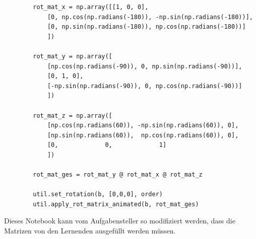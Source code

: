 \begin{center}
    \begin{verbatim}
        rot_mat_x = np.array([[1, 0, 0],
            [0, np.cos(np.radians(-180)), -np.sin(np.radians(-180))],
            [0, np.sin(np.radians(-180)), np.cos(np.radians(-180))]
            ])

        rot_mat_y = np.array([
            [np.cos(np.radians(-90)), 0, np.sin(np.radians(-90))],
            [0, 1, 0],
            [-np.sin(np.radians(-90)), 0, np.cos(np.radians(-90))]
            ])

        rot_mat_z = np.array([
            [np.cos(np.radians(60)), -np.sin(np.radians(60)), 0],
            [np.sin(np.radians(60)),  np.cos(np.radians(60)), 0],
            [0,             0,             1]
            ])

        rot_mat_ges = rot_mat_y @ rot_mat_x @ rot_mat_z

        util.set_rotation(b, [0,0,0], order)
        util.apply_rot_matrix_animated(b, rot_mat_ges)
    \end{verbatim}
\end{center}

Dieses Notebook kann vom Aufgabensteller so modifiziert werden,
dass die Matrizen von den Lernenden ausgefüllt werden müssen.



